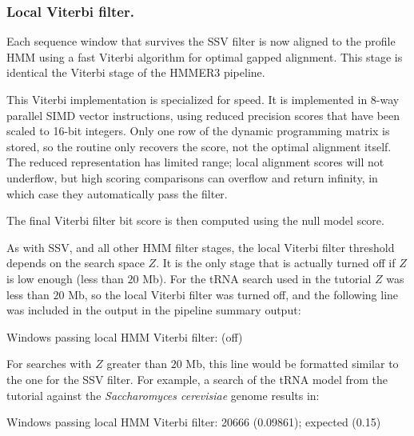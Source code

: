 \subsubsection{Local Viterbi filter.}
Each sequence window that survives the SSV filter is now aligned to
the profile HMM using a fast Viterbi algorithm for optimal gapped
alignment. This stage is identical the Viterbi stage of the HMMER3
pipeline. 

This Viterbi implementation is specialized for speed.  It is
implemented in 8-way parallel SIMD vector instructions, using reduced
precision scores that have been scaled to 16-bit integers. Only one
row of the dynamic programming matrix is stored, so the routine only
recovers the score, not the optimal alignment itself. The reduced
representation has limited range; local alignment scores will not
underflow, but high scoring comparisons can overflow and return
infinity, in which case they automatically pass the filter.

The final Viterbi filter bit score is then computed using the null
model score. 

As with SSV, and all other HMM filter stages, the local Viterbi filter
threshold depends on the search space $Z$. It is the only stage that
is actually turned off if $Z$ is low enough (less than $20$ Mb). 
For the tRNA search used in the tutorial $Z$ was less than $20$ Mb, so
the local Viterbi filter was turned off, and the following line was
included in the output in the pipeline summary output:

\begin{sreoutput}
Windows   passing  local HMM Viterbi       filter:                  (off)
\end{sreoutput}

For searches with $Z$ greater than $20$ Mb, this line would be
formatted similar to the one for the SSV filter. For example,
a search of the tRNA model from the tutorial against the
\emph{Saccharomyces cerevisiae} genome results in:

\begin{sreoutput}
Windows   passing  local HMM Viterbi       filter:           20666  (0.09861); expected (0.15)
\end{sreoutput}

